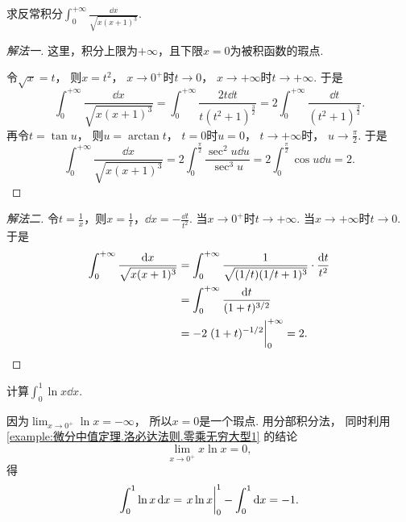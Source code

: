 \begin{example}
求反常积分\(\int_0^{+\infty} \frac{\dd{x}}{\sqrt{x(x+1)^3}}\).
\begin{solution}\let\qed\relax
\begin{proof}[解法一]
这里，积分上限为\(+\infty\)，且下限\(x=0\)为被积函数的瑕点.

令\(\sqrt{x} = t\)，
则\(x = t^2\)，
\(x\to0^+\)时\(t\to0\)，
\(x\to+\infty\)时\(t\to+\infty\).
于是\[
	\int_0^{+\infty} \frac{\dd{x}}{\sqrt{x(x+1)^3}}
	= \int_0^{+\infty} \frac{2t\dd{t}}{t(t^2+1)^{\frac32}}
	= 2 \int_0^{+\infty} \frac{\dd{t}}{(t^2+1)^{\frac32}}.
\]
再令\(t = \tan u\)，
则\(u = \arctan t\)，
\(t=0\)时\(u=0\)，
\(t\to+\infty\)时，
\(u\to\frac\pi2\).
于是\[
	\int_0^{+\infty} \frac{\dd{x}}{\sqrt{x(x+1)^3}}
	= 2 \int_0^{\frac\pi2} \frac{\sec^2 u \dd{u}}{\sec^3 u}
	= 2 \int_0^{\frac\pi2} \cos u \dd{u}
	= 2.
\]
\end{proof}
\begin{proof}[解法二]
令\(t = \frac1x\)，则\(x=\frac1t\)，\(\dd{x} = -\frac{\dd{t}}{t^2}\).
当\(x\to0^+\)时\(t\to+\infty\).
当\(x\to+\infty\)时\(t\to0\).
于是\begin{align*}
	\int_0^{+\infty} \frac{\dd{x}}{\sqrt{x(x+1)^3}}
	&= \int_0^{+\infty} \frac1{\sqrt{(1/t)(1/t+1)^3}} \cdot \frac{\dd{t}}{t^2} \\
	&= \int_0^{+\infty} \frac{\dd{t}}{(1+t)^{3/2}} \\
	&= -2 \eval{(1+t)^{-1/2}}_0^{+\infty}
	= 2.
\end{align*}
\end{proof}
\end{solution}
\end{example}

\begin{example}
计算\(\int_0^1 \ln x \dd{x}\).
\begin{solution}
因为\(\lim_{x\to0^+} \ln x = -\infty\)，
所以\(x=0\)是一个瑕点.
用分部积分法，
同时利用\cref{example:微分中值定理.洛必达法则.零乘无穷大型1} 的结论\[
	\lim_{x\to0^+} x \ln x = 0,
\]
得\[
	\int_0^1 \ln x \dd{x}
	= \eval{x \ln x}_0^1
	- \int_0^1 \dd{x}
	= -1.
\]
\end{solution}
\end{example}

